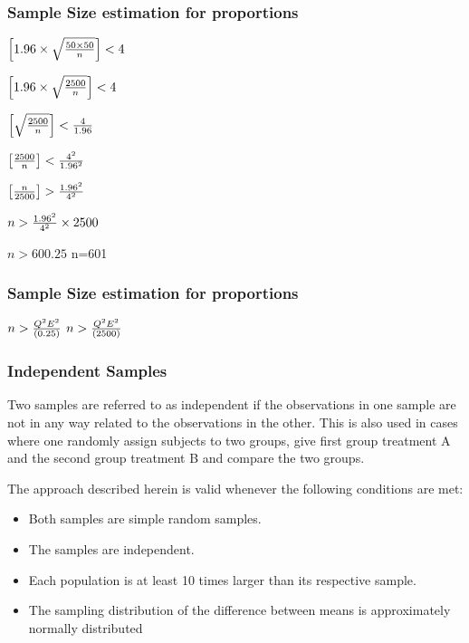 \documentclass[a4]{beamer}
\begin{document}
\begin{frame}
\frametitle{Sample Size estimation for proportions}

$\left[1.96 \times \sqrt{{ 50 \times 50 \over n}} \right]< 4 $


$\left[1.96 \times \sqrt{{ 2500 \over n}} \right]< 4 $

$\left[ \sqrt{{ 2500 \over n}} \right]< {4 \over 1.96}$

$\left[ { 2500 \over n} \right]< {4^2 \over 1.96^2}$

$\left[ { n \over 2500} \right]> {1.96^2 \over 4^2}$

$n> {1.96^2 \over 4^2} \times 2500$

$n>600.25$ 
n=601
\end{frame}
\begin{frame}

\frametitle{Sample Size estimation for proportions}


$n> {Q^2E^2 \over (0.25)}$
$n >{Q^2 E^2 \over (2500)}$

\end{frame}
\begin{frame}
\frametitle{Independent Samples}

Two samples are referred to as independent if the observations in one sample are not in any way related to the observations in the other. This is also used in cases where one randomly assign subjects to two groups, give first group treatment A and the second group treatment B and compare the two groups.


The approach described herein is valid whenever the following conditions are met:

\begin{itemize}
\item Both samples are simple random samples.
\item The samples are independent.
\item Each population is at least 10 times larger than its respective sample.
\item The sampling distribution of the difference between means is approximately normally distributed
\end{itemize}

\end{frame}
\end{document}

